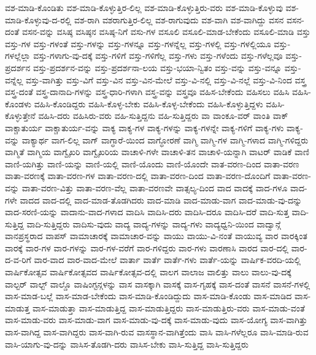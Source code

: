 {ವಶ-ಮಾಡಿ-ಕೊಂಡಿತು
ವಶ-ಮಾಡಿ-ಕೊಳ್ಳುತ್ತಿರ-ಲಿಲ್ಲ
ವಶ-ಮಾಡಿ-ಕೊಳ್ಳುತ್ತಿರು-ವರು
ವಶ-ಮಾಡಿ-ಕೊಳ್ಳುವು
ವಶ-ಮಾಡಿ-ಕೊಳ್ಳುವು-ದ-ರಲ್ಲಿ
ವಶ-ರಾಗಿ
ವಶರಾಗುತ್ತಿರ-ಲಿಲ್ಲ
ವಶ-ರಾಗುವುದು
ವಶ-ವಾಗಿ
ವಶ-ವಾಗಿದ್ದು
ವಸನ
ವಸನ-ದಂತೆ
ವಸನ-ವನ್ನು
ವಸಿಷ್ಠ
ವಸಿಷ್ಠನ
ವಸಿಷ್ಠ-ನಿಗೆ
ವಸು-ಗಳ
ವಸೂಲಿ
ವಸೂಲಿ-ಮಾಡ-ಬೇಕೆಂದು
ವಸೂಲಿ-ಮಾಡಿ
ವಸ್ತು
ವಸ್ತು-ಗಳ
ವಸ್ತು-ಗಳಂತೆ
ವಸ್ತು-ಗಳನ್ನು
ವಸ್ತು-ಗಳನ್ನೂ
ವಸ್ತು-ಗಳನ್ನೆಲ್ಲ
ವಸ್ತು-ಗಳಲ್ಲಿ
ವಸ್ತು-ಗಳಲ್ಲಿಯೂ
ವಸ್ತು-ಗಳಲ್ಲೆಲ್ಲಾ
ವಸ್ತು-ಗಳಾಗು-ವು-ದಕ್ಕೆ
ವಸ್ತು-ಗಳಿಗೆ
ವಸ್ತು-ಗಳಿಗೆಲ್ಲ
ವಸ್ತು-ಗಳು
ವಸ್ತು-ಗಳೆಂದು
ವಸ್ತು-ಗಳೆಲ್ಲವೂ
ವಸ್ತು-ಪ್ರದರ್ಶನ
ವಸ್ತು-ಪ್ರದರ್ಶನ-ವನ್ನು
ವಸ್ತು-ಪ್ರದರ್ಶನಾ-ಲಯ
ವಸ್ತು-ಭಯಾ-ನ್ವಿತಂ
ವಸ್ತು-ವನ್ನು
ವಸ್ತು-ವನ್ನೂ
ವಸ್ತು-ವನ್ನೆಲ್ಲ
ವಸ್ತು-ವಾಗಿತ್ತು
ವಸ್ತು-ವಿಗೆ
ವಸ್ತು-ವಿನ
ವಸ್ತು-ವಿನ-ಮೇಲೆ
ವಸ್ತು-ವಿ-ನಲ್ಲಿ
ವಸ್ತು-ವಿ-ನಲ್ಲೆ
ವಸ್ತು-ವಿ-ನಿಂದ
ವಸ್ತ್ರ
ವಸ್ತ್ರ-ದಂತೆ
ವಸ್ತ್ರ-ದಾನಾದಿ-ಗಳನ್ನು
ವಸ್ತ್ರ-ಧಾರಿ-ಗಳಾಗಿ
ವಸ್ತ್ರ-ವನ್ನು
ವಸ್ತ್ರವೂ
ವಹಿಸ-ಬೇಕೆಂದು
ವಹಿಸಲು
ವಹಿಸಿ
ವಹಿಸಿ-ಕೊಂಡಳು
ವಹಿಸಿ-ಕೊಂಡಿದ್ದರು
ವಹಿಸಿ-ಕೊಳ್ಳ-ಬೇಕು
ವಹಿಸಿ-ಕೊಳ್ಳ-ಬೇಕೆಂದು
ವಹಿಸಿ-ಕೊಳ್ಳುತ್ತಿದ್ದಳು
ವಹಿಸಿ-ಕೊಳ್ಳುತ್ತೇನೆ
ವಹಿಸಿ-ದರು
ವಹಿಸಿರು-ವರು
ವಹಿ-ಸುತ್ತಿದ್ದನು
ವಹಿ-ಸುತ್ತಿದ್ದರು
ವಾ
ವಾಂಕೂ-ವರ್
ವಾಂತಿ
ವಾಕ್
ವಾಕ್ಚಾತುರ್ಯ
ವಾಕ್ಚಾತುರ್ಯ-ವನ್ನು
ವಾಕ್ಯ
ವಾಕ್ಯ-ಗಳ
ವಾಕ್ಯ-ಗಳನ್ನು
ವಾಕ್ಯ-ಗಳನ್ನೇ
ವಾಕ್ಯ-ಗಳಿಗೆ
ವಾಕ್ಯ-ಗಳು
ವಾಕ್ಯ-ವನ್ನು
ವಾಕ್ಯಾರ್ಥ
ವಾಗ-ಲಿಲ್ಲ
ವಾಗ್
ವಾಗ್ಧಾರೆ-ಯಿಂದ
ವಾಗ್ಧೋರಣೆ
ವಾಗ್ಮಿ
ವಾಗ್ಮಿ-ಗಳ
ವಾಗ್ಮಿ-ಗಳಾದ
ವಾಗ್ಮಿ-ಗಳಿದ್ದರು
ವಾಗ್ಮಿತೆ
ವಾಗ್ಮಿಯ
ವಾಗ್ವೈಖರಿ
ವಾಗ್ವೈಖರಿಯ
ವಾಚಾಳಿ-ಗಳೇ
ವಾಚಾಳಿ-ತನ
ವಾಚಾಳಿ-ಯನ್ನಾಗಿ
ವಾಟರ್
ವಾಡಿಕೆ
ವಾಣಿ
ವಾಣಿ-ಯಗಿತ್ತು
ವಾಣಿ-ಯನ್ನು
ವಾಣಿ-ಯಲ್ಲಿ
ವಾಣಿ-ಯೊಂದು
ವಾಣಿ-ಯೊಂದೇ
ವಾತ-ವರಣ-ದಿಂದ
ವಾತಾ-ವರಣ
ವಾತಾ-ವರಣಕ್ಕೆ
ವಾತಾ-ವರಣ-ಗಳ
ವಾತಾ-ವರಣ-ದಲ್ಲಿ
ವಾತಾ-ವರಣ-ದಿಂದ
ವಾತಾ-ವರಣ-ದೊಂದಿಗೆ
ವಾತಾ-ವರಣ-ವನ್ನು
ವಾತಾ-ವರಣ-ವಿತ್ತು
ವಾತಾ-ವರಣ-ವೆಲ್ಲ
ವಾತಾ-ವರಣವೇ
ವಾತ್ಸಲ್ಯ-ದಿಂದ
ವಾದ
ವಾದಕ್ಕೆ
ವಾದ-ಗಳೂ
ವಾದ-ಗಳೇ
ವಾದದ
ವಾದ-ದಲ್ಲಿ
ವಾದ-ಮಾಡ-ತೊಡಗಿದರು
ವಾದ-ಮಾಡಿ
ವಾದ-ಮಾಡು-ವಾಗ
ವಾದ-ಮಾಡು-ವು-ದನ್ನು
ವಾದ-ಸರಣಿ-ಯನ್ನು
ವಾದಾನು-ವಾದ-ಗಳಾದ
ವಾದಿಸಿ
ವಾದಿಸಿ-ದರು
ವಾದಿಸಿ-ದರೂ
ವಾದಿಸಿ-ದರೆ
ವಾದಿ-ಸುತ್ತ
ವಾದಿ-ಸುತ್ತಿದ್ದ
ವಾದಿ-ಸುತ್ತಿದ್ದರು
ವಾದಿಸು-ವುದು
ವಾದ್ಯ
ವಾದ್ಯ-ಗಳನ್ನು
ವಾದ್ಯ-ಗಳು
ವಾದ್ಯಧ್ವನಿ-ಯಿಂದ
ವಾದ್ವಾನ್ಗೆ
ವಾನಪ್ರಸ್ಥರಾದ
ವಾಪಸ್
ವಾಮಾಚಾರಕ್ಕೆ
ವಾಮಾಚಾರ-ವನ್ನು
ವಾಯು
ವಾಯು-ವಿ-ನಂತೆ
ವಾಯುವ್ಯ
ವಾರ
ವಾರಕ್ಕಿಂತ
ವಾರಕ್ಕೆ
ವಾರ-ಗಳ
ವಾರ-ಗಳನ್ನು
ವಾರ-ಗಳ-ವರೆಗೆ
ವಾರ-ಗಳಿದ್ದರು
ವಾರ-ಗಳು
ವಾರಣಾಸಿ
ವಾರದ
ವಾರ-ದಲ್ಲಿ
ವಾರ-ದ-ವ-ರಿಗೆ
ವಾರ-ವಾದ
ವಾರ-ವಾದ-ಮೇಲೆ
ವಾರ್ತಾ
ವಾರ್ತೆ
ವಾರ್ತೆ-ಗಳು
ವಾರ್ತೆ-ಯನ್ನು
ವಾರ್ಷಿಕ-ವರದಿ-ಯಲ್ಲಿ
ವಾರ್ಷಿಕೋತ್ಸವ
ವಾರ್ಷಿಕೋತ್ಸವದ
ವಾರ್ಷಿಕೋತ್ಸವ-ದಲ್ಲಿ
ವಾಲಗ
ವಾಲಾಜ
ವಾಲಿತ್ತು
ವಾಲು
ವಾಲು-ವು-ದಕ್ಕೆ
ವಾಲ್ಟರ್
ವಾಲ್ಟ್
ವಾಲ್ಡೊ
ವಾಷಿಂಗ್ಟನ್ಗಳನ್ನು
ವಾಸ
ವಾಸಕ್ಕಾಗಿ
ವಾಸಕ್ಕೆ
ವಾಸ-ಗೃಹಕ್ಕೆ
ವಾಸ-ದಂತೆ
ವಾಸನೆ
ವಾಸನೆ-ಗಳಲ್ಲಿ
ವಾಸ-ಮಾಡ-ಬಲ್ಲೆ
ವಾಸ-ಮಾಡ-ಬೇಕೆಂದು
ವಾಸ-ಮಾಡಿ-ಕೊಂಡಿದ್ದುದು
ವಾಸ-ಮಾಡಿ-ಕೊಂಡು
ವಾಸ-ಮಾಡಿದ
ವಾಸ-ಮಾಡುತ್ತ
ವಾಸ-ಮಾಡುತ್ತಾ
ವಾಸ-ಮಾಡುತ್ತಿದ್ದ
ವಾಸ-ಮಾಡುತ್ತಿದ್ದರು
ವಾಸ-ಮಾಡುತ್ತಿರು-ವರು
ವಾಸ-ಮಾಡು-ವಂತೆ
ವಾಸ-ಮಾಡು-ವರು
ವಾಸ-ಮಾಡು-ವಾಗ
ವಾಸ-ಮಾಡು-ವು-ದಕ್ಕೆ
ವಾಸ-ಮಾಡು-ವುದು
ವಾಸ-ಯೋಗ್ಯ
ವಾಸ-ವಾಗಿತ್ತು
ವಾಸ-ವಾಗಿದ್ದ
ವಾಸ-ವಾಗಿದ್ದರು
ವಾಸ-ವಾಗಿ-ರುವ
ವಾಸಸ್ಥಾನ-ವಾಗಿತ್ತೆಂದು
ವಾಸಿ
ವಾಸಿ-ಗಳೆಲ್ಲರೂ
ವಾಸಿ-ಮಾಡಿ-ರುವ
ವಾಸಿ-ಯಾಗು-ವು-ದನ್ನು
ವಾಸಿಸ-ತೊಡಗಿ-ದರು
ವಾಸಿಸ-ಬೇಕು
ವಾಸಿ-ಸುತ್ತಿದ್ದ
ವಾಸಿ-ಸುತ್ತಿದ್ದರು
}

